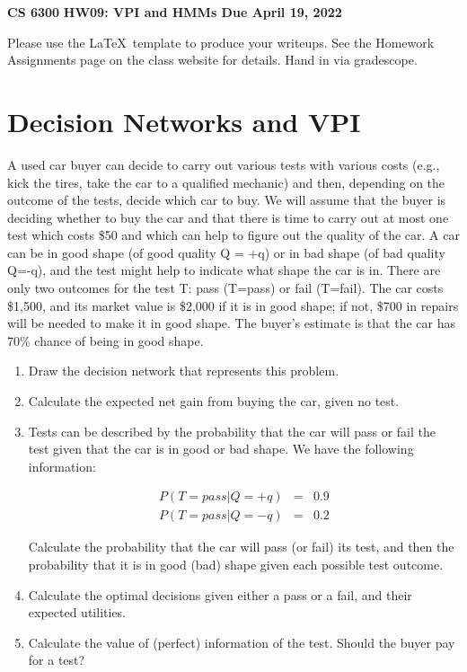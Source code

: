\documentclass[12pt]{article}
\begin{document}
\begin{center}
{\bf CS 6300} \hfill {\large\bf HW09: VPI and HMMs \hfill Due April 19, 2022}
\end{center}

\noindent
Please use the \LaTeX\ template to produce your writeups. See the
Homework Assignments page on the class website for details.  Hand in
via gradescope.

\section{Decision Networks and VPI}

A used car buyer can decide to carry out various tests with various
costs (e.g., kick the tires, take the car to a qualified mechanic) and
then, depending on the outcome of the tests, decide which car to buy.
We will assume that the buyer is deciding whether to buy the car and
that there is time to carry out at most one test which costs \$50 and
which can help to figure out the quality of the car.  A car can be in
good shape (of good quality Q = +q) or in bad shape (of bad quality
Q=-q), and the test might help to indicate what shape the car is in.
There are only two outcomes for the test T: pass (T=pass) or fail
(T=fail).  The car costs \$1,500, and its market value is \$2,000 if
it is in good shape; if not, \$700 in repairs will be needed to make
it in good shape.  The buyer's estimate is that the car has 70\%
chance of being in good shape.

\begin{enumerate}

\item  Draw the decision network that represents this problem.

\item  Calculate the expected net gain from buying the car, given no test.

\item Tests can be described by the probability that the car will pass
  or fail the test given that the car is in good or bad shape. We have
  the following information:

\begin{eqnarray*}
P(T = pass | Q = +q) &=&  0.9 \\
P(T = pass | Q = -q) &=&  0.2
\end{eqnarray*}

Calculate the probability that the car will pass (or fail) its test,
and then the probability that it is in good (bad) shape given each
possible test outcome.

\item Calculate the optimal decisions given either a pass or a fail,
  and their expected utilities.

\item Calculate the value of (perfect) information of the test. Should
  the buyer pay for a test?

\end{enumerate}
\end{document}
